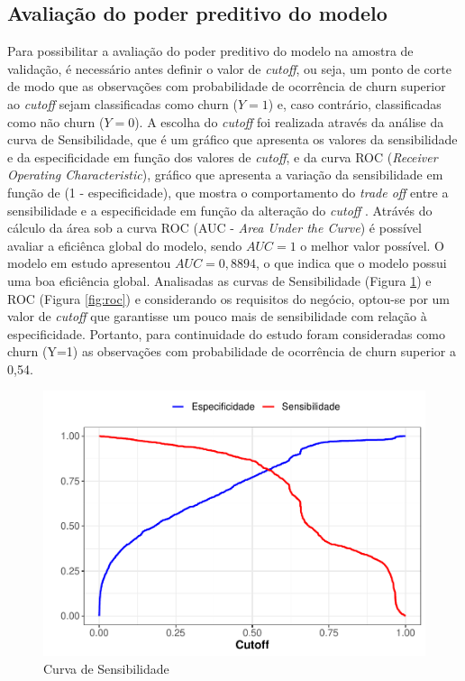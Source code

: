 \documentclass[twocolumn]{rbef}
\newcommand{\1}{\mathbbm{1}}
\begin{document}
\hypertarget{avaliauxe7uxe3o-do-poder-preditivo-do-modelo}{%
\subsection{Avaliação do poder preditivo do modelo}\label{avaliauxe7uxe3o-do-poder-preditivo-do-modelo}}

Para possibilitar a avaliação do poder preditivo do modelo na amostra de validação, é necessário antes definir o valor de \textit{cutoff}, ou seja, um ponto de corte de modo que as observações com probabilidade de ocorrência de churn superior ao \textit{cutoff} sejam classificadas como churn (\(Y=1\)) e, caso contrário, classificadas como não churn (\(Y=0\)). A escolha do \textit{cutoff} foi realizada através da análise da curva de Sensibilidade, que é um gráfico que apresenta os valores da sensibilidade e da especificidade em função dos valores de \textit{cutoff}, e da curva ROC (\textit{Receiver Operating Characteristic}), gráfico que apresenta a variação da sensibilidade em função de (1 - especificidade), que mostra o comportamento do \textit{trade off} entre a sensibilidade e a especificidade em função da alteração do \textit{cutoff} \cite{Favero2017}. Atrávés do cálculo da área sob a curva ROC (AUC - \textit{Area Under the Curve}) é possível avaliar a eficiênca global do modelo, sendo \(AUC=1\) o melhor valor possível. O modelo em estudo apresentou \(AUC = 0,8894\), o que indica que o modelo possui uma boa eficiência global. Analisadas as curvas de Sensibilidade (Figura \ref{fig:senscurve}) e ROC (Figura \ref{fig:roc}) e considerando os requisitos do negócio, optou-se por um valor de \textit{cutoff} que garantisse um pouco mais de sensibilidade com relação à especificidade. Portanto, para continuidade do estudo foram consideradas como churn (Y=1) as observações com probabilidade de ocorrência de churn superior a 0,54.

\begin{figure}

{\centering \includegraphics[width=1\linewidth]{article_files/figure-latex/senscurve-1} 

}

\caption{Curva de Sensibilidade}\label{fig:senscurve}
\end{figure}
\end{document}
